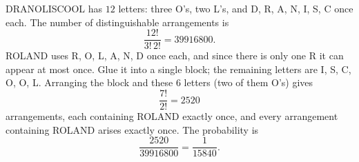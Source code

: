 DRANOLISCOOL has $12$ letters: three O's, two L's, and D, R, A, N, I, S, C once each. The number of distinguishable arrangements is
\[\dfrac{12!}{3!\,2!}=39916800.\]
ROLAND uses R, O, L, A, N, D once each, and since there is only one R it can appear at most once. Glue it into a single block; the remaining letters are I, S, C, O, O, L. Arranging the block and these $6$ letters (two of them O's) gives
\[\dfrac{7!}{2!}=2520\]
arrangements, each containing ROLAND exactly once, and every arrangement containing ROLAND arises exactly once. The probability is
\[\dfrac{2520}{39916800}=\boxed{\dfrac{1}{15840}}.\]
